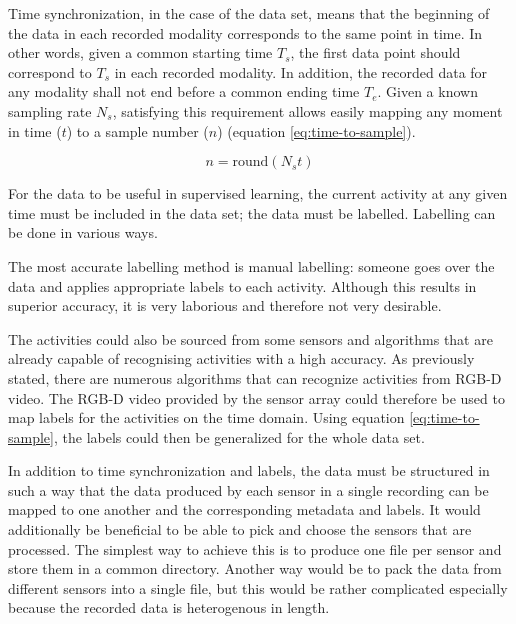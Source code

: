 Time synchronization, in the case of the data set,
means that the beginning of the data in each recorded modality
corresponds to the same point in time.
In other words, given a common starting time $T_{s}$,
the first data point should correspond to $T_{s}$ in each recorded modality.
In addition, the recorded data for any modality shall not end before a common ending time $T_{e}$.
Given a known sampling rate $N_{s}$,
satisfying this requirement allows easily mapping any moment in time ($t$) to a sample number ($n$) (equation \ref{eq:time-to-sample}).

\begin{equation}
    \label{eq:time-to-sample}
    n = \mathrm{round}(N_{s} t)
\end{equation}

For the data to be useful in supervised learning,
the current activity at any given time must be included in the data set;
the data must be labelled.
Labelling can be done in various ways.

The most accurate labelling method is manual labelling:
someone goes over the data and applies appropriate labels to each activity.
Although this results in superior accuracy,
it is very laborious and therefore not very desirable.

The activities could also be sourced from some sensors and algorithms that are 
already capable of recognising activities with a high accuracy.
As previously stated, there are numerous algorithms that can recognize activities from RGB-D video.
The RGB-D video provided by the sensor array could therefore be used to map labels for the activities on the time domain.
Using equation \ref{eq:time-to-sample}, the labels could then be generalized for the whole data set.

In addition to time synchronization and labels,
the data must be structured in such a way that the data produced by each sensor in a single recording
can be mapped to one another and the corresponding metadata and labels.
It would additionally be beneficial to be able to pick and choose the sensors that are processed.
The simplest way to achieve this is to produce one file per sensor and store them in a common directory.
Another way would be to pack the data from different sensors into a single file,
but this would be rather complicated especially because the recorded data is heterogenous in length.